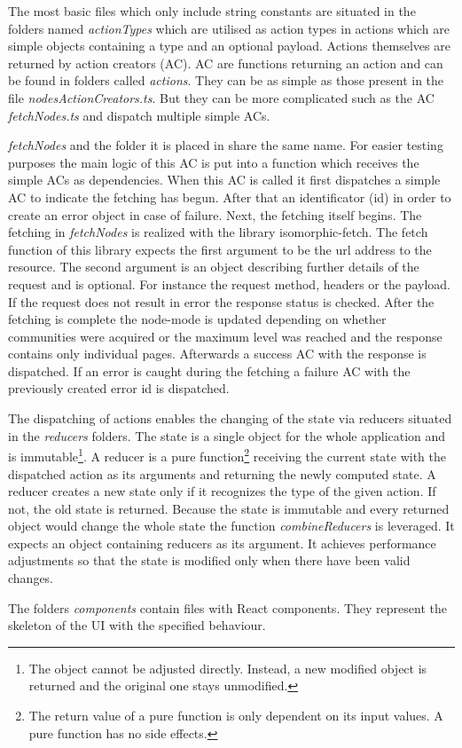 The most basic files which only include string constants are situated in the folders named \textit{actionTypes} which are utilised as action types in actions which are simple objects containing a type and an optional payload. Actions themselves are returned by action creators (AC). AC are functions returning an action and can be found in folders called \textit{actions}. They can be as simple as those present in the file \textit{nodesActionCreators.ts}. But they can be more complicated such as the AC \textit{fetchNodes.ts} and dispatch multiple simple ACs. 

\textit{fetchNodes} and the folder it is placed in share the same name. For easier testing purposes the main logic of this AC is put into a function which receives the simple ACs as dependencies. When this AC is called it first dispatches a simple AC to indicate the fetching has begun. After that an identificator (id) in order to create an error object in case of failure. Next, the fetching itself begins. The fetching in \textit{fetchNodes} is realized with the library isomorphic-fetch. The fetch function of this library expects the first argument to be the url address to the resource. The second argument is an object describing further details of the request and is optional. For instance the request method, headers or the payload. If the request does not result in error the response status is checked. After the fetching is complete the node-mode is updated depending on whether communities were acquired or the maximum level was reached and the response contains only individual pages. Afterwards a success AC with the response is dispatched. If an error is caught during the fetching a failure AC with the previously created error id is dispatched.

The dispatching of actions enables the changing of the state via reducers situated in the \textit{reducers} folders. The state is a single object for the whole application and is immutable\footnote{The object cannot be adjusted directly. Instead, a new modified object is returned and the original one stays unmodified.}. A reducer is a pure function\footnote{The return value of a pure function is only dependent on its input values. A pure function has no side effects.} receiving the current state with the dispatched action as its arguments and returning the newly computed state. A reducer creates a new state only if it recognizes the type of the given action. If not, the old state is returned. Because the state is immutable and every returned object would change the whole state the function \textit{combineReducers} is leveraged. It expects an object containing reducers as its argument. It achieves performance adjustments so that the state is modified only when there have been valid changes.

The folders \textit{components} contain files with React components. They represent the skeleton of the UI with the specified behaviour. 

